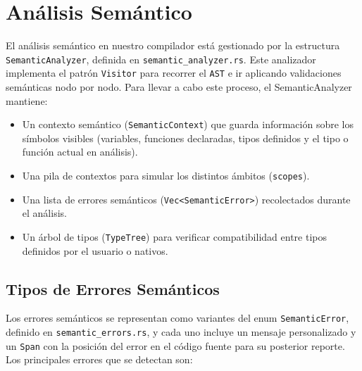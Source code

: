 \documentclass{article}
\begin{document}
\section{Análisis Semántico}
El análisis semántico en nuestro compilador está gestionado por la estructura \texttt{SemanticAnalyzer}, definida en \texttt{semantic\_analyzer.rs}. Este analizador implementa el patrón \texttt{Visitor} para recorrer el \texttt{AST} e ir aplicando validaciones semánticas nodo por nodo. Para llevar a cabo este proceso, el SemanticAnalyzer mantiene:

\begin{itemize}
\item Un contexto semántico (\texttt{SemanticContext}) que guarda información sobre los símbolos visibles (variables, funciones declaradas, tipos definidos y el tipo o función actual en análisis).

\item Una pila de contextos para simular los distintos ámbitos (\texttt{scopes}).

\item Una lista de errores semánticos (\texttt{Vec<SemanticError>}) recolectados durante el análisis.

\item Un árbol de tipos (\texttt{TypeTree}) para verificar compatibilidad entre tipos definidos por el usuario o nativos.
\end{itemize}

\subsection{Tipos de Errores Semánticos}
Los errores semánticos se representan como variantes del enum \texttt{SemanticError}, definido en \texttt{semantic\_errors.rs}, y cada uno incluye un mensaje personalizado y un \texttt{Span} con la posición del error en el código fuente para su posterior reporte. Los principales errores que se detectan son:
\end{document}
